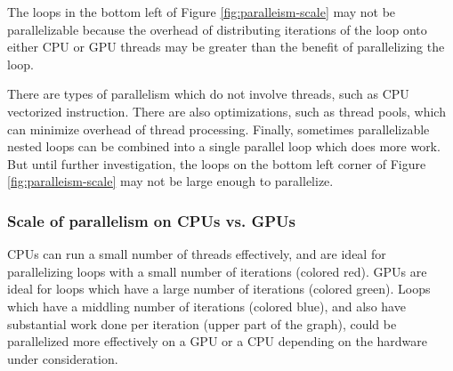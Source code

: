 \documentclass[12pt,twoside]{reedthesis}
\begin{document}
		The loops in the bottom left of Figure \ref{fig:paralleism-scale} may not be parallelizable because the overhead of distributing iterations of the loop onto either CPU or GPU threads may be greater than the benefit of parallelizing the loop. 
		
		There are types of parallelism which do not involve threads, such as CPU vectorized instruction. There are also optimizations, such as thread pools, which can minimize overhead of thread processing. Finally, sometimes parallelizable nested loops can be combined into a single parallel loop which does more work. But until further investigation, the loops on the bottom left corner of Figure \ref{fig:paralleism-scale} may not be large enough to parallelize. 
		
		\subsubsection{Scale of parallelism on CPUs vs. GPUs}
		
		CPUs can run a small number of threads effectively, and are ideal for parallelizing loops with a small number of iterations (colored red).%
		GPUs are ideal for loops which have a large number of iterations (colored green).%
		Loops which have a middling number of iterations (colored blue), and also have substantial work done per iteration (upper part of the graph), could be parallelized more effectively on a GPU or a CPU depending on the hardware under consideration. %
		
		
		
		
\end{document}

